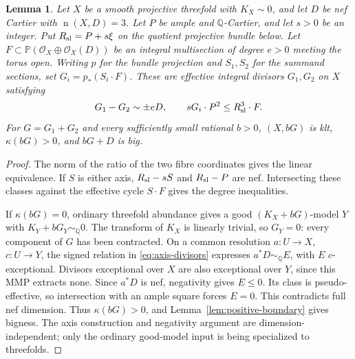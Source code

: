 \documentclass[12pt,a4paper,psamsfonts]{amsart}
\theoremstyle{definition}
\theoremstyle{plain}
\newtheorem{lemma}{Lemma}[section]
\newcommand{\Q}{\mathbb Q}
\newcommand{\OO}{\mathcal O}
\newcommand{\nef}{\operatorname{n}}
\begin{document}
\begin{lemma}\label{lem:multisection-axes}
Let $X$ be a smooth projective threefold with $K_X\sim0$, and let
$D$ be nef Cartier with $\nef(X,D)=3$. Let $P$ be ample and $\mathbb{Q}$-Cartier, and let $s>0$ be an integer. Put $R_{\rm sl}=P+s\xi$ on the
quotient projective bundle below. Let $F\subset
\mathbb P(\OO_X\oplus\OO_X(D))$ be an integral multisection
of degree $e>0$ meeting the torus open. Writing $p$ for the bundle projection and $S_1,S_2$ for the summand
sections, set $G_i=p_*(S_i\cdot F)$. These are effective integral divisors $G_1,G_2$ on $X$ satisfying
\begin{equation}\label{eq:axis-divisors}
 G_1-G_2\sim\pm eD,\qquad
 sG_i\cdot P^2\le R_{\rm sl}^3\cdot F.
\end{equation}
For $G=G_1+G_2$ and every sufficiently small rational $b>0$,
$(X,bG)$ is klt, $\kappa(bG)>0$, and $bG+D$ is big.
\end{lemma}
\begin{proof}
The norm of the ratio of the two fibre coordinates gives the
linear equivalence. If $S$ is either axis, $R_{\rm sl}-sS$
and $R_{\rm sl}-P$ are nef. Intersecting these classes against
the effective cycle $S\cdot F$ gives the degree inequalities.

If $\kappa(bG)=0$, ordinary threefold abundance gives a good
$(K_X+bG)$-model $Y$ with $K_Y+bG_Y\sim_\Q0$.
The transform of $K_X$ is linearly trivial, so $G_Y=0$:
every component of $G$ has been contracted. On a common
resolution $a:U\to X$, $c:U\to Y$, the signed relation in
\eqref{eq:axis-divisors} expresses $a^*D\sim_\Q E$, with
$E$ $c$-exceptional. Divisors exceptional over $X$ are also
exceptional over $Y$, since this MMP extracts none.
Since $a^*D$ is nef, negativity gives $E\le0$.
Its class is pseudo-effective, so intersection with an ample
square forces $E=0$. This contradicts full nef dimension.
Thus $\kappa(bG)>0$, and Lemma~\ref{lem:positive-boundary}
gives bigness. The axis construction and negativity argument
are dimension-independent; only the ordinary good-model input
is being specialized to threefolds.
\end{proof}
\end{document}
